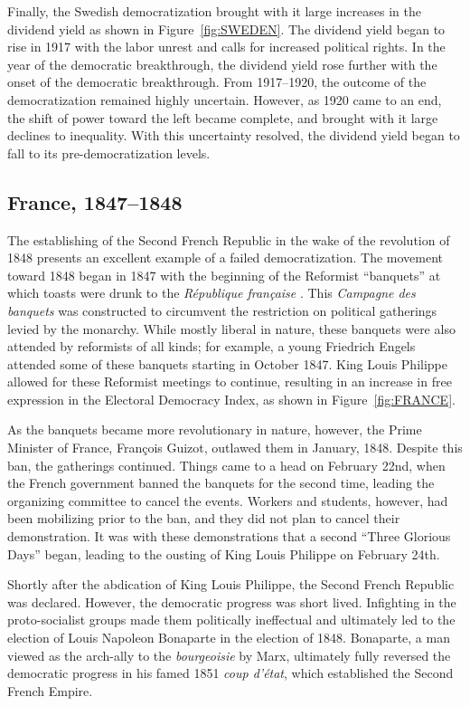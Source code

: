 \documentclass[12pt]{article}
\numberwithin{equation}{section}
\begin{document}
Finally, the Swedish democratization brought with it large increases in the dividend yield as shown in Figure~\ref{fig:SWEDEN}. The dividend yield began to rise in 1917 with the labor unrest and calls for increased political rights. In the year of the democratic breakthrough, the dividend yield rose further with the onset of the democratic breakthrough. From 1917--1920, the outcome of the democratization remained highly uncertain. However, as 1920 came to an end, the shift of power toward the left became complete, and brought with it large declines to inequality. With this uncertainty resolved, the dividend yield began to fall to its pre-democratization levels.

\subsection{France, 1847--1848}\label{section:FRANCE}

The establishing of the Second French Republic in the wake of the revolution of 1848 presents an excellent example of a failed democratization.  The movement toward 1848 began in 1847 with the beginning of the Reformist ``banquets'' at which toasts were drunk to the \textit{R\'{e}publique fran\c{c}aise} \citep{Marx1850}. This \textit{Campagne des banquets} was constructed to circumvent the restriction on political gatherings levied by the monarchy. While mostly liberal in nature, these banquets were also attended by reformists of all kinds; for example, a young Friedrich Engels attended some of these banquets starting in October 1847. King Louis Philippe allowed for these Reformist meetings to continue, resulting in an increase in free expression in the Electoral Democracy Index, as shown in Figure~\ref{fig:FRANCE}.  

As the banquets became more revolutionary in nature,  however, the Prime Minister of France, Fran\c{c}ois Guizot, outlawed them in January, 1848. Despite this ban, the gatherings continued. Things came to a head on February 22nd, when the French government banned the banquets for the second time, leading the organizing committee to cancel the events. Workers and students, however, had been mobilizing prior to the ban, and they did not plan to cancel their demonstration. It was with these demonstrations that a second ``Three Glorious Days'' began, leading to the ousting of King Louis Philippe on February 24th.

Shortly after the abdication of King Louis Philippe, the Second French Republic was declared. However, the democratic progress was short lived. Infighting in the proto-socialist groups made them politically ineffectual and ultimately led to the election of Louis Napoleon Bonaparte in the election of 1848. Bonaparte, a man viewed as the arch-ally to the \textit{bourgeoisie} by Marx, ultimately fully reversed the democratic progress in his famed 1851 \textit{coup d'\'{e}tat}, which established the Second French Empire.
\end{document}
